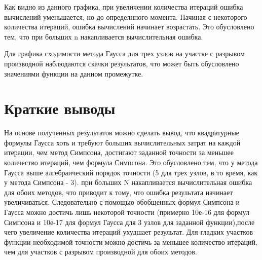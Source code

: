 Как видно из данного графика, при увеличении количества итераций ошибка вычислений уменьшается, но до определнного момента. Начиная с некоторого количества итераций, ошибка вычислений начинает возрастать. Это обусловлено тем, что при больших n накапливается вычислительная ошибка.

Для графика сходимости метода Гаусса для трех узлов на участке с разрывом производной наблюдаются скачки результатов, что может быть обусловлено значениями функции на данном промежутке. 

\section{Краткие выводы}

На основе полученных результатов можно сделать вывод, что квадратурные формулы Гаусса хоть и требуют больших вычислительных затрат на каждой итерации, чем метод Симпсона, достигают заданной точности за меньшее количество итераций, чем формула Симпсона. Это обусловлено тем, что у метода Гаусса выше алгебраический порядок точности (5 для трех узлов, в то время, как у метода Симпсона - 3). при больших N накапливается вычислительная ошибка для обоих методов, что приводит к тому, что ошибка результата начинает увеличиваться. Следовательно с помощью обобщенных формул Симпсона и Гаусса можно достичь лишь некоторой точности (примерно 10е-16 для формул Симпсона и 10е-17 для формул Гаусса для 3 узлов для заданной функции),после чего увеличение количества итераций ухудшает результат. Для гладких участков функции необходимой точности можно достичь за меньшее количество итераций, чем для участков с разрывом производной для обоих методов.


